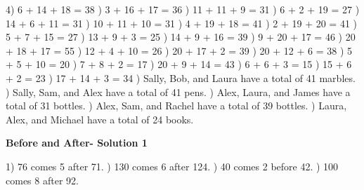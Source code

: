\documentclass{article}%
\begin{document}
4) 6 + 14 + 18 = 38%
) 3 + 16 + 17 = 36%
) 11 + 11 + 9 = 31%
) 6 + 2 + 19 = 27%
) 14 + 6 + 11 = 31%
) 10 + 11 + 10 = 31%
) 4 + 19 + 18 = 41%
) 2 + 19 + 20 = 41%
) 5 + 7 + 15 = 27%
) 13 + 9 + 3 = 25%
) 14 + 9 + 16 = 39%
) 9 + 20 + 17 = 46%
) 20 + 18 + 17 = 55%
) 12 + 4 + 10 = 26%
) 20 + 17 + 2 = 39%
) 20 + 12 + 6 = 38%
) 5 + 5 + 10 = 20%
) 7 + 8 + 2 = 17%
) 20 + 9 + 14 = 43%
) 6 + 6 + 3 = 15%
) 15 + 6 + 2 = 23%
) 17 + 14 + 3 = 34%
) Sally, Bob, and Laura have a total of 41 marbles.%
) Sally, Sam, and Alex have a total of 41 pens.%
) Alex, Laura, and James have a total of 31 bottles.%
) Alex, Sam, and Rachel have a total of 39 bottles.%
) Laura, Alex, and Michael have a total of 24 books.%
\newline%
\newpage%
\large%
\begin{center}%
\textbf{Before and After- Solution 1}%
\newline%
\end{center} \normalsize%
1) 76 comes 5 after 71.%
) 130 comes 6 after 124.%
) 40 comes 2 before 42.%
) 100 comes 8 after 92.%
\newline%
\end{document}
